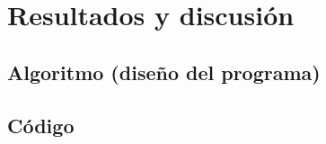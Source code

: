 \chapter{Resultados y discusión}


\section{Algoritmo (diseño del programa)}

\section{Código}







